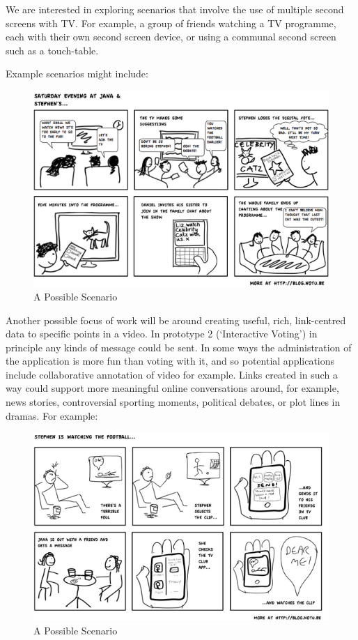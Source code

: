 \documentclass{notube}
\begin{document}
We are interested in exploring scenarios that involve the use of multiple second screens with TV. For example, a group of friends watching a TV programme, each with their own second screen device, or using a communal second screen such as a touch-table. 

Example scenarios might include:

\begin{figure}[htbp]
\begin{center}
\includegraphics[width=6in]{images/postcard1.png}
\caption{A Possible Scenario} \label{fig:postcard1}
\end{center}
\end{figure}

Another possible focus of work will be around creating useful, rich, link-centred data to specific points in a video. In prototype 2 (`Interactive Voting') in principle any kinds of message could be sent. In some ways the administration of the application is more fun than voting with it, and so potential applications include collaborative annotation of video for example. Links created in such a way could support more meaningful online conversations around, for example, news stories, controversial sporting moments, political debates, or plot lines in dramas. For example:

\begin{figure}[htbp]
\begin{center}
\includegraphics[width=6in]{images/postcard2.png}
\caption{A Possible Scenario} \label{fig:postcard2}
\end{center}
\end{figure}
\end{document}
